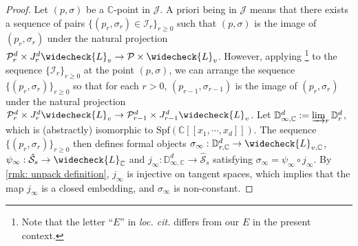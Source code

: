 \documentclass[letter, 11pt]{article}
\theoremstyle{plain}
\theoremstyle{definition}
\newcommand{\IC}{\mathbb{C}}
\newcommand{\ID}{\mathbb{D}}
\newcommand{\che}[1]{\widecheck{#1}}
\newcommand{\<}{\langle}
\renewcommand{\>}{\rangle}
\newcommand{\sI}{\mathcal{I}}
\newcommand{\sJ}{\mathcal{J}}
\newcommand{\sH}{\mathcal{H}}
\newcommand{\sS}{\mathcal{S}}
\newcommand{\sP}{\mathcal{P}}
\newcommand{\Spf}{\mathrm{Spf}}
\begin{document}
\begin{proof}

Let $(p, \sigma)$ be a $\IC$-point in $\sJ$. A priori being in $\sJ$ means that there exists a sequence of pairs $\{ (p_{r}, \sigma_{r}) \in \sI_r \}_{r \geq 0}$ such that $(p, \sigma)$ is the image of $(p_{r}, \sigma_{r})$ under the natural projection $\sP^d_r \times J^d_r \che{L}_{v} \to \sP \times \che{L}_{v}$. However, applying \cite[Lem.~5.3]{urbanik2021transcendence}\footnote{Note that the letter ``$E$'' in \textit{loc. cit.} differs from our $E$ in the present context.} to the sequence $\{ \sI_{r} \}_{r \geq 0}$ at the point $(p, \sigma)$, we can arrange the sequence $\{ (p_{r}, \sigma_{r}) \}_{r \geq 0}$ so that for each $r > 0$, $(p_{r - 1}, \sigma_{r - 1})$ is the image of $(p_{r}, \sigma_{r})$ under the natural projection $\sP^d_r \times J^d_r \che{L}_{v} \to \sP^d_{r - 1} \times J^d_{r - 1} \che{L}_{v}$. Let $\ID^d_{\infty, \IC} := \varinjlim_r \ID^d_r$, which is (abstractly) isomorphic to $\Spf(\IC[\![x_1, \cdots, x_d]\!])$. The sequence $\{ (p_{r}, \sigma_{r}) \}_{r \geq 0}$ then defines formal objects $\sigma_{\infty} : \ID^{d}_{r,\IC} \to \che{L}_{v,\IC}$, $\psi_{\infty} : \hat{\sS}_{s} \to \che{L}_{\IC}$ and $j_{\infty} : \ID^{d}_{\infty,\IC} \to \hat{\sS}_{s}$ satisfying $\sigma_{\infty} = \psi_{\infty} \circ j_{\infty}$. By \ref{rmk: unpack definition}, $j_\infty$ is injective on tangent spaces, which implies that the map $j_{\infty}$ is a closed embedding, and $\sigma_{\infty}$ is non-constant.




\end{proof}
\end{document}
